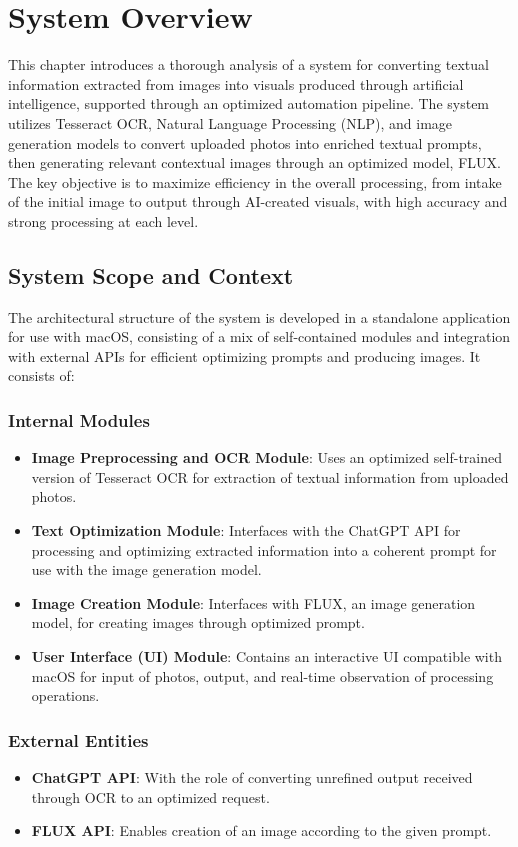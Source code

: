 \chapter{System Overview}
This chapter introduces a thorough analysis of a system for converting textual information extracted from images into visuals produced through artificial intelligence, supported through an optimized automation pipeline. The system utilizes Tesseract OCR, Natural Language Processing (NLP), and image generation models to convert uploaded photos into enriched textual prompts, then generating relevant contextual images through an optimized model, FLUX. The key objective is to maximize efficiency in the overall processing, from intake of the initial image to output through AI-created visuals, with high accuracy and strong processing at each level.

\section{System Scope and Context}

The architectural structure of the system is developed in a standalone application for use with macOS, consisting of a mix of self-contained modules and integration with external APIs for efficient optimizing prompts and producing images. It consists of:

\subsection*{Internal Modules}
\begin{itemize}
    \item \textbf{Image Preprocessing and OCR Module}: Uses an optimized self-trained version of Tesseract OCR for extraction of textual information from uploaded photos.
    \item \textbf{Text Optimization Module}: Interfaces with the ChatGPT API for processing and optimizing extracted information into a coherent prompt for use with the image generation model.
    \item \textbf{Image Creation Module}: Interfaces with FLUX, an image generation model, for creating images through optimized prompt.
    \item \textbf{User Interface (UI) Module}: Contains an interactive UI compatible with macOS for input of photos, output, and real-time observation of processing operations.
\end{itemize}

\subsection*{External Entities}
\begin{itemize}
    \item \textbf{ChatGPT API}: With the role of converting unrefined output received through OCR to an optimized request.
    \item \textbf{FLUX API}: Enables creation of an image according to the given prompt.
\end{itemize}

